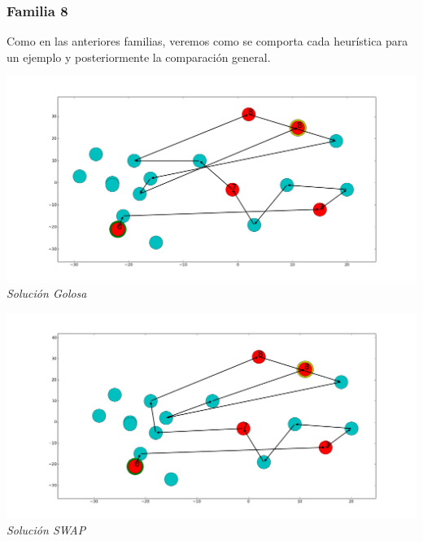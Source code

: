   
\subsubsection*{Familia 8}

Como en las anteriores familias, veremos como se comporta cada heur\'istica para un ejemplo y  posteriormente la comparaci\'on general.

\vspace*{0.3cm} \vspace*{0.3cm}
  \begin{center}
 \includegraphics[scale=0.3]{./EJ3/randomgoloso.png}\\
 {            \textit{Soluci\'on Golosa}}
  \end{center}
  \vspace*{0.3cm}

\vspace*{0.3cm} \vspace*{0.3cm}
  \begin{center}
 \includegraphics[scale=0.3]{./EJ3/randomswap.png}\\
 {            \textit{Soluci\'on SWAP}}
  \end{center}
  \vspace*{0.3cm}

